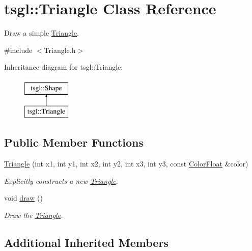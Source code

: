 \hypertarget{classtsgl_1_1_triangle}{\section{tsgl\-:\-:Triangle Class Reference}
\label{classtsgl_1_1_triangle}
}


Draw a simple \hyperlink{classtsgl_1_1_triangle}{Triangle}.  




{\ttfamily \#include $<$Triangle.\-h$>$}

Inheritance diagram for tsgl\-:\-:Triangle\-:\begin{figure}[H]
\begin{center}
\leavevmode
\includegraphics[height=2.000000cm]{classtsgl_1_1_triangle}
\end{center}
\end{figure}
\subsection*{Public Member Functions}
\begin{DoxyCompactItemize}
\item 
\hyperlink{classtsgl_1_1_triangle_a5ee7f4735479c2692d1d6a2d22ba5c28}{Triangle} (int x1, int y1, int x2, int y2, int x3, int y3, const \hyperlink{structtsgl_1_1_color_float}{Color\-Float} \&color)
\begin{DoxyCompactList}\small\item\em Explicitly constructs a new \hyperlink{classtsgl_1_1_triangle}{Triangle}. \end{DoxyCompactList}\item 
void \hyperlink{classtsgl_1_1_triangle_a83b30f9f7c800146fa900d32a58fa0c7}{draw} ()
\begin{DoxyCompactList}\small\item\em Draw the \hyperlink{classtsgl_1_1_triangle}{Triangle}. \end{DoxyCompactList}\end{DoxyCompactItemize}
\subsection*{Additional Inherited Members}



